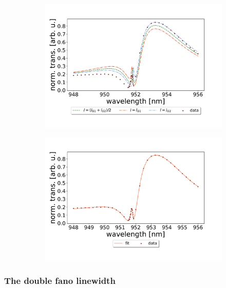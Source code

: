 \begin{figure}[h!]
    \centering
    \begin{subfigure}[b]{0.49\textwidth}
        \centering
        \includegraphics[width=\textwidth]{figures/results/34um_long_scan_sim_comparison.pdf}
        \caption{}
        \label{fig:34um_long_scan_sim_comparison}
    \end{subfigure}
    \begin{subfigure}[b]{0.49\textwidth}
        \centering
        \includegraphics[width=\textwidth]{figures/results/34um_long_scan_fit.pdf}
        \caption{}
        \label{fig:34um_long_scan_fit}
    \end{subfigure}
\end{figure}

\subsubsection{The double fano linewidth}

